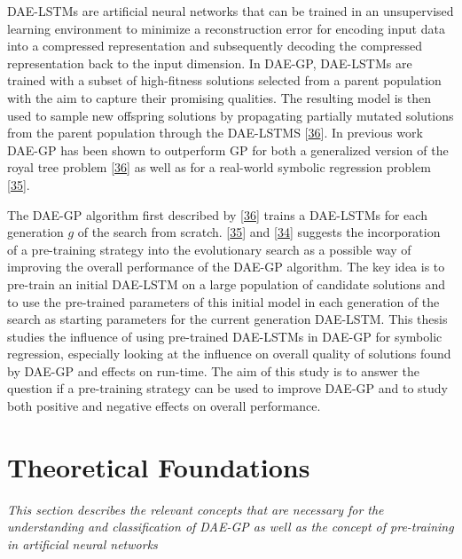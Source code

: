 \documentclass[
  11pt,
]{article}
\begin{document}
DAE-LSTMs are artificial neural networks that can be trained in an unsupervised learning environment to minimize a reconstruction error for encoding input data into a compressed representation and subsequently decoding the compressed representation back to the input dimension.
In DAE-GP, DAE-LSTMs are trained with a subset of high-fitness solutions selected from a parent population with the aim to capture their promising qualities.
The resulting model is then used to sample new offspring solutions by propagating partially mutated solutions from the parent population through the DAE-LSTMS {[}\protect\hyperlink{ref-dae-gp_2020_rtree}{36}{]}.
In previous work DAE-GP has been shown to outperform GP for both a generalized version of the royal tree problem {[}\protect\hyperlink{ref-dae-gp_2020_rtree}{36}{]} as well as for a real-world symbolic regression problem {[}\protect\hyperlink{ref-dae-gp_2022_symreg}{35}{]}.

The DAE-GP algorithm first described by {[}\protect\hyperlink{ref-dae-gp_2020_rtree}{36}{]} trains a DAE-LSTMs for each generation \(g\) of the search from scratch.
{[}\protect\hyperlink{ref-dae-gp_2022_symreg}{35}{]} and {[}\protect\hyperlink{ref-daegp_explore_exploit}{34}{]} suggests the incorporation of a pre-training strategy into the evolutionary search as a possible way of improving the overall performance of the DAE-GP algorithm.
The key idea is to pre-train an initial DAE-LSTM on a large population of candidate solutions and to use the pre-trained parameters of this initial model in each generation of the search as starting parameters for the current generation DAE-LSTM.
This thesis studies the influence of using pre-trained DAE-LSTMs in DAE-GP for symbolic regression, especially looking at the influence on overall quality of solutions found by DAE-GP and effects on run-time.
The aim of this study is to answer the question if a pre-training strategy can be used to improve DAE-GP and to study both positive and negative effects on overall performance.

\hypertarget{theoretical-foundations}{%
\section{Theoretical Foundations}\label{theoretical-foundations}}

\emph{This section describes the relevant concepts that are necessary for the understanding and classification of DAE-GP as well as the concept of pre-training in artificial neural networks}
\end{document}
